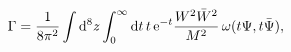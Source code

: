 \begin{equation}\label{n4gamma}
\Gamma = \frac{1}{8\pi^{2}}\int{\rm d}^8 z \int_{0}^{\infty}{\rm
d}t\,t\,{\rm e}^{-t}\frac{ W^{2}\bar{W}^{2}}{M^2}\,\omega (t\Psi,
t\bar{\Psi}),
\end{equation}

